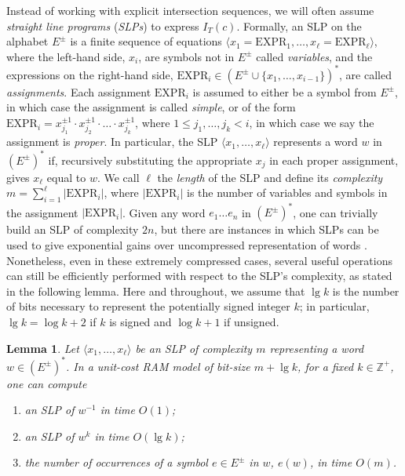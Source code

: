 \documentclass[11pt]{amsart}
\newcommand{\Z}{\mathbb{Z}}
\numberwithin{equation}{section}
\theoremstyle{plain}
\newtheorem{lemma}[equation]{Lemma}
\theoremstyle{definition}
\begin{document}
Instead of working with explicit intersection sequences, we will often assume \textit{straight line programs} (\emph{SLPs}) to express $I_T(c)$.
Formally, an SLP on the alphabet $E^{\pm}$ is a finite sequence of equations $\langle x_1 = \text{EXPR}_1, \dots, x_\ell = \text{EXPR}_\ell\rangle$, where the left-hand side, $x_i$, are symbols not in $E^{\pm}$ called \textit{variables}, and the expressions on the right-hand side, $\text{EXPR}_i\in(E^{\pm}\cup\{x_1,\dots,x_{i-1}\})^*$, are called \textit{assignments}.
Each assignment $\text{EXPR}_i$ is assumed to either be a symbol from $E^{\pm}$, in which case the assignment is called \textit{simple}, or of the form $\text{EXPR}_i=x_{j_1}^{\pm 1}\cdot x_{j_2}^{\pm 1}\cdot \dots \cdot x_{j_k}^{\pm 1}$, where $1\leq j_1,\dots,j_k < i$, in which case we say the assignment is \textit{proper}.
In particular, the SLP $\langle x_1,\dots,x_\ell\rangle$ represents a word $w$ in $(E^{\pm})^*$ if, recursively substituting the appropriate $x_{j}$ in each proper assignment, gives $x_\ell$ equal to $w$.
We call $\ell$ the \textit{length} of the SLP and define its \textit{complexity} $m=\sum_{i=1}^\ell |\text{EXPR}_i|$, where $|\text{EXPR}_i|$ is the number of variables and symbols in the assignment $|\text{EXPR}_i|$.
Given any word $e_1\dots e_n$ in $(E^{\pm})^*$, one can trivially build an SLP of complexity $2n$, but there are instances in which SLPs can be used to give exponential gains over uncompressed representation of words \cite{schaefer2008computing}. 
Nonetheless, even in these extremely compressed cases, several useful operations can still be efficiently performed with respect to the SLP's complexity, as stated in the following lemma. 
Here and throughout, we assume that $\lg k$ is the number of bits necessary to represent the potentially signed integer $k$; in particular, $\lg k = \log k + 2$ if $k$ is signed and $\log k +1$ if unsigned.

\begin{lemma}\label{lm: slp}
    Let $\langle x_1,\dots,x_\ell\rangle$ be an SLP of complexity $m$ representing a word $w\in (E^{\pm})^*$. In a unit-cost RAM model of bit-size $m + \lg k$, for a fixed $k\in \Z^+$, one can compute
    \begin{enumerate}[label=(\alph*)]
        \item an SLP of $w^{-1}$ in time $O(1)$;
        \item an SLP of $w^k$ in time $O(\lg k)$;
        \item the number of occurrences of a symbol $e\in E^{\pm}$ in $w$, $e(w)$, in time $O(m)$.
    \end{enumerate}
\end{lemma}
\end{document}
